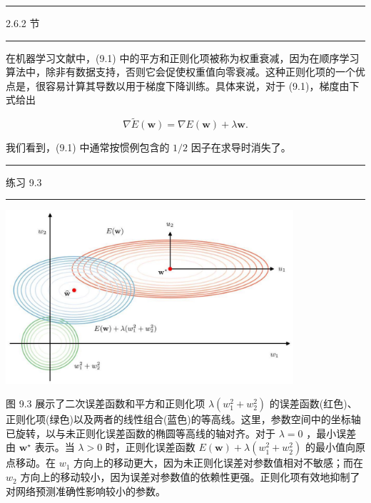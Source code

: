 \documentclass[10pt]{report}
\newcommand{\HRule}{\begin{center}\rule{0.9\linewidth}{0.2mm}\end{center}}
\begin{document}
\HRule

2.6.2 节

\HRule

在机器学习文献中，(9.1) 中的平方和正则化项被称为权重衰减，因为在顺序学习算法中，除非有数据支持，否则它会促使权重值向零衰减。这种正则化项的一个优点是，很容易计算其导数以用于梯度下降训练。具体来说，对于 (9.1)，梯度由下式给出

\[
\nabla \widetilde{E}\left( \mathbf{w}\right)  = \nabla E\left( \mathbf{w}\right)  + \lambda \mathbf{w}. \tag{9.5}
\]

我们看到，(9.1) 中通常按惯例包含的 \(1/2\) 因子在求导时消失了。

\HRule

练习 9.3

\HRule

\begin{center}
\includegraphics[max width=0.8\textwidth]{images/0194e279-9b28-703a-88f4-c3ac21e2010d_280_268_353_1103_666_0.jpg}
\end{center}
\hspace*{3em} 

图 9.3 展示了二次误差函数和平方和正则化项 \(\lambda \left( {{w}_{1}^{2} + {w}_{2}^{2}}\right)\) 的误差函数(红色)、正则化项(绿色)以及两者的线性组合(蓝色)的等高线。这里，参数空间中的坐标轴已旋转，以与未正则化误差函数的椭圆等高线的轴对齐。对于 \(\lambda  = 0\) ，最小误差由 \({\mathbf{w}}^{ \star  }\) 表示。当 \(\lambda  > 0\) 时，正则化误差函数 \(E\left( \mathbf{w}\right)  + \lambda \left( {{w}_{1}^{2} + {w}_{2}^{2}}\right)\) 的最小值向原点移动。在 \({w}_{1}\) 方向上的移动更大，因为未正则化误差对参数值相对不敏感；而在 \({w}_{2}\) 方向上的移动较小，因为误差对参数值的依赖性更强。正则化项有效地抑制了对网络预测准确性影响较小的参数。
\end{document}
